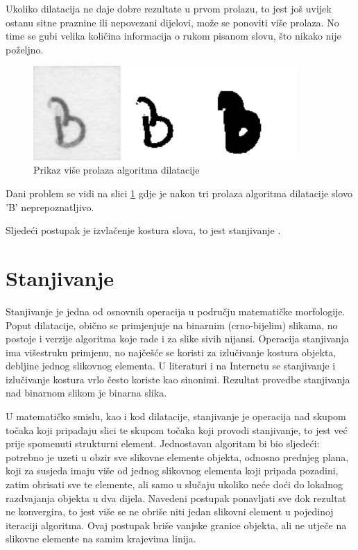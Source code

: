 Ukoliko dilatacija ne daje dobre rezultate u prvom prolazu, to jest još uvijek ostanu sitne praznine ili nepovezani dijelovi, može se ponoviti više prolaza. No time se gubi velika količina informacija o rukom pisanom slovu, što nikako nije poželjno.
\begin{figure}[htb]
    \centering
    \includegraphics[width=10cm]{images/dilation_bad_example.png}
    \caption{Prikaz više prolaza algoritma dilatacije}
    \label{fig:dilation_bad_example}
\end{figure}
Dani problem se vidi na slici \ref{fig:dilation_bad_example} gdje je nakon tri prolaza algoritma dilatacije slovo 'B' neprepoznatljivo.

Sljedeći postupak je izvlačenje kostura slova, to jest stanjivanje .

\section{Stanjivanje}

Stanjivanje  je jedna od osnovnih operacija u području matematičke morfologije. Poput dilatacije, obično se primjenjuje na binarnim (crno-bijelim) slikama, no postoje i verzije algoritma koje rade i za slike sivih nijansi. Operacija stanjivanja ima višestruku primjenu, no najčešće se koristi za izlučivanje kostura objekta, debljine jednog slikovnog elementa. U literaturi i na Internetu se stanjivanje i izlučivanje kostura vrlo često koriste kao sinonimi. Rezultat provedbe stanjivanja nad binarnom slikom je binarna slika.

U matematičko smislu, kao i kod dilatacije, stanjivanje je operacija nad skupom točaka koji pripadaju slici te skupom točaka koji provodi stanjivanje, to jest već prije spomenuti strukturni element. Jednostavan algoritam bi bio sljedeći: potrebno je uzeti u obzir sve slikovne elemente objekta, odnosno prednjeg plana, koji za susjeda imaju više od jednog slikovnog elementa koji pripada pozadini, zatim obrisati sve te elemente, ali samo u slučaju ukoliko neće doći do lokalnog razdvajanja objekta u dva dijela. Navedeni postupak ponavljati sve dok rezultat ne konvergira, to jest više se ne obriše niti jedan slikovni element u pojedinoj iteraciji algoritma. Ovaj postupak briše vanjske granice objekta, ali ne utječe na slikovne elemente na samim krajevima linija.

